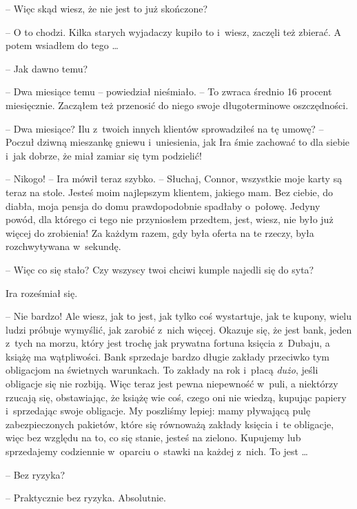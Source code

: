 \documentclass[oneside,polish,11pt,rmheadings]{mwbk}
\begin{document}
-- Więc skąd wiesz, że nie jest to już skończone?

-- O to chodzi. Kilka starych wyjadaczy kupiło to i~wiesz, zaczęli też zbierać. A potem wsiadłem do tego \ldots 

-- Jak dawno temu? 

-- Dwa miesiące temu -- powiedział nieśmiało. -- To zwraca średnio 16 procent miesięcznie. Zacząłem też przenosić do niego swoje długoterminowe oszczędności.

-- Dwa miesiące? Ilu z~twoich innych klientów sprowadziłeś na tę umowę? -- Poczuł dziwną mieszankę gniewu i~uniesienia, jak Ira śmie zachować to dla siebie i~jak dobrze, że miał zamiar się tym podzielić!

-- Nikogo! -- Ira mówił teraz szybko. -- Słuchaj, Connor, wszystkie moje karty są teraz na stole. Jesteś moim najlepszym klientem, jakiego mam. Bez ciebie, do diabła, moja pensja do domu prawdopodobnie spadłaby o~połowę. Jedyny powód, dla którego ci tego nie przyniosłem przedtem, jest, wiesz, nie było już więcej do zrobienia! Za każdym razem, gdy była oferta na te rzeczy, była rozchwytywana w~sekundę.

-- Więc co się stało? Czy wszyscy twoi chciwi kumple najedli się do syta?

Ira roześmiał się. 

-- Nie bardzo! Ale wiesz, jak to jest, jak tylko coś wystartuje, jak te kupony, wielu ludzi próbuje wymyślić, jak zarobić z~nich więcej. Okazuje się, że jest bank, jeden z~tych na morzu, który jest trochę jak prywatna fortuna księcia z~Dubaju, a książę ma wątpliwości. Bank sprzedaje bardzo długie zakłady przeciwko tym obligacjom na świetnych warunkach. To zakłady na rok i~płacą \textit{dużo}, jeśli obligacje się nie rozbiją. Więc teraz jest pewna niepewność w~puli, a niektórzy rzucają się, obstawiając, że książę wie coś, czego oni nie wiedzą, kupując papiery i~sprzedając swoje obligacje. My poszliśmy lepiej: mamy pływającą pulę zabezpieczonych pakietów, które się równoważą zakłady księcia i~te obligacje, więc bez względu na to, co się stanie, jesteś na zielono. Kupujemy lub sprzedajemy codziennie w~oparciu o~stawki na każdej z~nich. To jest  \ldots 

-- Bez ryzyka? 

-- Praktycznie bez ryzyka. Absolutnie.
\end{document}

